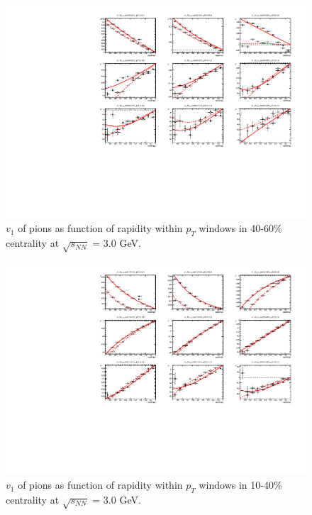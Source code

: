 \begin{figure}[hbt!]
\centering
\includegraphics[width=0.85\linewidth]{figures/chapter03/3gev_pionp_v1VSy_9pT_cent0.pdf}
\caption{$v_1$ of pions as function of rapidity within $p_T$ windows in 40-60\% centrality at $\sqrt{s_{NN}}$ = 3.0 GeV.}
\label{fig:3gev_pion_v1y_pt_cent0}
\end{figure}
    
\begin{figure}[hbt!]
\centering
\includegraphics[width=0.85\linewidth]{figures/chapter03/3gev_pionp_v1VSy_9pT_cent1.pdf}
\caption{$v_1$ of pions as function of rapidity within $p_T$ windows in 10-40\% centrality at $\sqrt{s_{NN}}$ = 3.0 GeV.}
\label{fig:3gev_pion_v1y_pt_cent1}
\end{figure}
        
